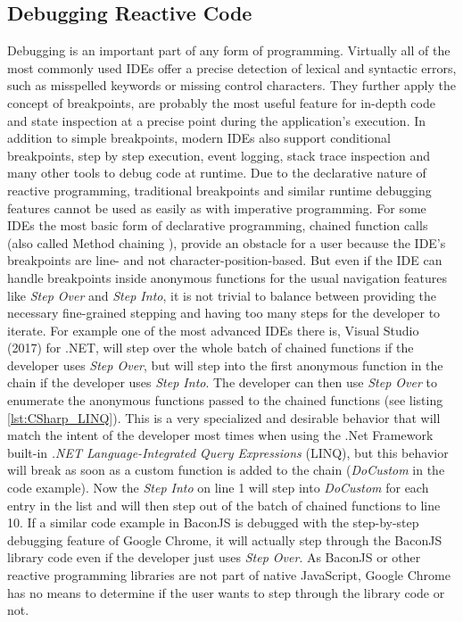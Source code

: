 \subsection{Debugging Reactive Code}
Debugging is an important part of any form of programming. Virtually all of the most commonly used IDEs offer a precise detection of lexical and syntactic errors, such as misspelled keywords or missing control characters. They further apply the concept of breakpoints, are probably the most useful feature for in-depth code and state inspection at a precise point during the application's execution. In addition to simple breakpoints, modern IDEs also support conditional breakpoints, step by step execution, event logging, stack trace inspection and many other tools to debug code at runtime. Due to the declarative nature of  reactive programming, traditional breakpoints and similar runtime debugging features cannot be used as easily as with imperative programming. For some IDEs the most basic form of declarative programming, chained function calls (also called Method chaining \cite{MethodChaining}), provide an obstacle for a user because the IDE's breakpoints are line- and not character-position-based. But even if the IDE can handle breakpoints inside anonymous functions for the usual navigation features like \emph{Step Over} and \emph{Step Into}, it is not trivial to balance between providing the necessary fine-grained stepping and having too many steps for the developer to iterate. For example one of the most advanced IDEs there is, Visual Studio (2017) for .NET, will step over the whole batch of chained functions if the developer uses \emph{Step Over}, but will step into the first anonymous function in the chain if the developer uses \emph{Step Into}. The developer can then use \emph{Step Over} to enumerate the anonymous functions passed to the chained functions (see listing \ref{lst:CSharp_LINQ}). This is a very specialized and desirable behavior that will match the intent of the developer most times when using the .Net Framework built-in \emph{.NET Language-Integrated Query Expressions} (LINQ), but this behavior will break as soon as a custom function is added to the chain (\emph{DoCustom} in the code example). Now the \emph{Step Into} on line 1 will step into \emph{DoCustom} for each entry in the list and will then step out of the batch of chained functions to line 10. If a similar code example in BaconJS is debugged with the step-by-step debugging feature of Google Chrome, it will actually step through the BaconJS library code even if the developer just uses \emph{Step Over}. As BaconJS or other reactive programming libraries are not part of native JavaScript, Google Chrome has no means to determine if the user wants to step through the library code or not. 
